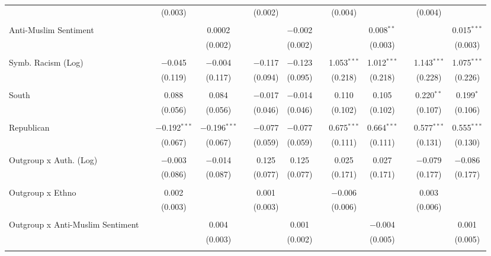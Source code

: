 \begin{table}[H]
{\begin{tabular}{@{\extracolsep{5pt}}lcccccccccccc}
  &  & (0.003) &  &  & (0.002) &  &  & (0.004) &  &  & (0.004) &  \\ 
  & & & & & & & & & & & & \\ 
 Anti-Muslim Sentiment &  &  & 0.0002 &  &  & $-$0.002 &  &  & 0.008$^{**}$ &  &  & 0.015$^{***}$ \\ 
  &  &  & (0.002) &  &  & (0.002) &  &  & (0.003) &  &  & (0.003) \\ 
  & & & & & & & & & & & & \\ 
 Symb. Racism (Log) &  & $-$0.045 & $-$0.004 &  & $-$0.117 & $-$0.123 &  & 1.053$^{***}$ & 1.012$^{***}$ &  & 1.143$^{***}$ & 1.075$^{***}$ \\ 
  &  & (0.119) & (0.117) &  & (0.094) & (0.095) &  & (0.218) & (0.218) &  & (0.228) & (0.226) \\ 
  & & & & & & & & & & & & \\ 
 South &  & 0.088 & 0.084 &  & $-$0.017 & $-$0.014 &  & 0.110 & 0.105 &  & 0.220$^{**}$ & 0.199$^{*}$ \\ 
  &  & (0.056) & (0.056) &  & (0.046) & (0.046) &  & (0.102) & (0.102) &  & (0.107) & (0.106) \\ 
  & & & & & & & & & & & & \\ 
 Republican &  & $-$0.192$^{***}$ & $-$0.196$^{***}$ &  & $-$0.077 & $-$0.077 &  & 0.675$^{***}$ & 0.664$^{***}$ &  & 0.577$^{***}$ & 0.555$^{***}$ \\ 
  &  & (0.067) & (0.067) &  & (0.059) & (0.059) &  & (0.111) & (0.111) &  & (0.131) & (0.130) \\ 
  & & & & & & & & & & & & \\ 
 Outgroup x Auth. (Log) &  & $-$0.003 & $-$0.014 &  & 0.125 & 0.125 &  & 0.025 & 0.027 &  & $-$0.079 & $-$0.086 \\ 
  &  & (0.086) & (0.087) &  & (0.077) & (0.077) &  & (0.171) & (0.171) &  & (0.177) & (0.177) \\ 
  & & & & & & & & & & & & \\ 
 Outgroup x Ethno &  & 0.002 &  &  & 0.001 &  &  & $-$0.006 &  &  & 0.003 &  \\ 
  &  & (0.003) &  &  & (0.003) &  &  & (0.006) &  &  & (0.006) &  \\ 
  & & & & & & & & & & & & \\ 
 Outgroup x Anti-Muslim Sentiment &  &  & 0.004 &  &  & 0.001 &  &  & $-$0.004 &  &  & 0.001 \\ 
  &  &  & (0.003) &  &  & (0.002) &  &  & (0.005) &  &  & (0.005) \\ 
  & & & & & & & & & & & & \\ 

\end{tabular}}
\end{table}
